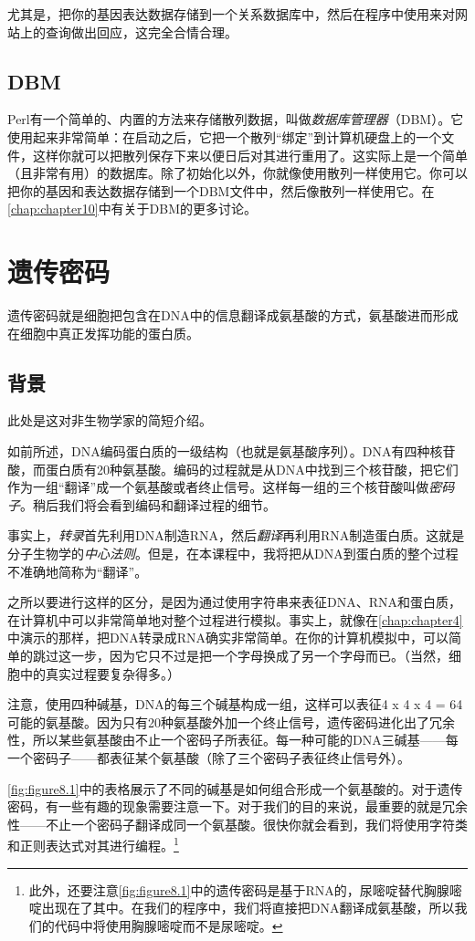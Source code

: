 尤其是，把你的基因表达数据存储到一个关系数据库中，然后在程序中使用来对网站上的查询做出回应，这完全合情合理。

\subsection{DBM}
Perl有一个简单的、内置的方法来存储散列数据，叫做\textit{数据库管理器}（DBM）。它使用起来非常简单：在启动之后，它把一个散列“绑定”到计算机硬盘上的一个文件，这样你就可以把散列保存下来以便日后对其进行重用了。这实际上是一个简单（且非常有用）的数据库。除了初始化以外，你就像使用散列一样使用它。你可以把你的基因和表达数据存储到一个DBM文件中，然后像散列一样使用它。在\autoref{chap:chapter10}中有关于DBM的更多讨论。

\section{遗传密码}
遗传密码就是细胞把包含在DNA中的信息翻译成氨基酸的方式，氨基酸进而形成在细胞中真正发挥功能的蛋白质。

\subsection{背景}
此处是这对非生物学家的简短介绍。

如前所述，DNA编码蛋白质的一级结构（也就是氨基酸序列）。DNA有四种核苷酸，而蛋白质有20种氨基酸。编码的过程就是从DNA中找到三个核苷酸，把它们作为一组“翻译”成一个氨基酸或者终止信号。这样每一组的三个核苷酸叫做\textit{密码子}。稍后我们将会看到编码和翻译过程的细节。

事实上，\textit{转录}首先利用DNA制造RNA，然后\textit{翻译}再利用RNA制造蛋白质。这就是分子生物学的\textit{中心法则}。但是，在本课程中，我将把从DNA到蛋白质的整个过程不准确地简称为“翻译”。

之所以要进行这样的区分，是因为通过使用字符串来表征DNA、RNA和蛋白质，在计算机中可以非常简单地对整个过程进行模拟。事实上，就像在\autoref{chap:chapter4}中演示的那样，把DNA转录成RNA确实非常简单。在你的计算机模拟中，可以简单的跳过这一步，因为它只不过是把一个字母换成了另一个字母而已。（当然，细胞中的真实过程要复杂得多。）

注意，使用四种碱基，DNA的每三个碱基构成一组，这样可以表征4 x 4 x 4 = 64可能的氨基酸。因为只有20种氨基酸外加一个终止信号，遗传密码进化出了冗余性，所以某些氨基酸由不止一个密码子所表征。每一种可能的DNA三碱基——每一个密码子——都表征某个氨基酸（除了三个密码子表征终止信号外）。

\autoref{fig:figure8.1}中的表格展示了不同的碱基是如何组合形成一个氨基酸的。对于遗传密码，有一些有趣的现象需要注意一下。对于我们的目的来说，最重要的就是冗余性——不止一个密码子翻译成同一个氨基酸。很快你就会看到，我们将使用字符类和正则表达式对其进行编程。\footnote{此外，还要注意\autoref{fig:figure8.1}中的遗传密码是基于RNA的，尿嘧啶替代胸腺嘧啶出现在了其中。在我们的程序中，我们将直接把DNA翻译成氨基酸，所以我们的代码中将使用胸腺嘧啶而不是尿嘧啶。}

